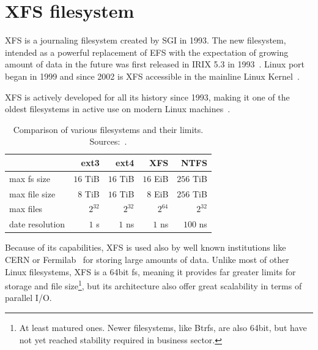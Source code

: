 
\chapter{XFS filesystem} \label{chap:xfs}

XFS is a journaling filesystem created by SGI in 1993. The new filesystem,
intended as a powerful replacement of EFS with the expectation of growing
amount of data in the future was first released in IRIX 5.3 in
1993~\cite{xfsOriginal}. Linux port began in 1999 and since 2002 is
XFS accessible in the mainline Linux Kernel~\cite[Chap. 1.2,
1.3]{xfsHistory}.

XFS is actively developed for all its history since 1993, making it one of
the oldest filesystems in active use on modern Linux
machines~\cite[40:25]{fsOrigin}.


\begin{table}[h]
\begin{tabular}{|l||r|r|r|r|}
\hline
& ext3 & ext4 & XFS & NTFS \\

\hline
\hline
max fs size & $16$ TiB & $16$ TiB & $16$ EiB& $256$ TiB\\
\hline
max file size & $8$ TiB & $16$ TiB & $8$ EiB & $256$ TiB\\
\hline
max files & $2^{32}$ & $2^{32}$& $2^{64}$ & $2^{32}$\\
\hline
date resolution & $1$ s & $1$ ns & $1$ ns & $100$ ns\\
\hline
\end{tabular}
\caption{Comparison of various filesystems and their limits. Sources:~\cite{inodesInLinux,NTFS1,NTFS2,NTFSfiletime,XFSforLinux}.}
\label{tab:xfs:comparison}
\end{table}



Because of its capabilities, XFS is used also by well known institutions
like CERN or Fermilab~\cite{XFSforLinux} for storing large amounts of data.
Unlike most of other Linux filesystems, XFS is a 64bit fs, meaning it
provides far greater limits for storage and file size\footnote{At least
matured ones. Newer filesystems, like Btrfs, are also 64bit, but have not
yet reached stability required in business sector.}, but its architecture
also offer great scalability in terms of parallel I/O.

